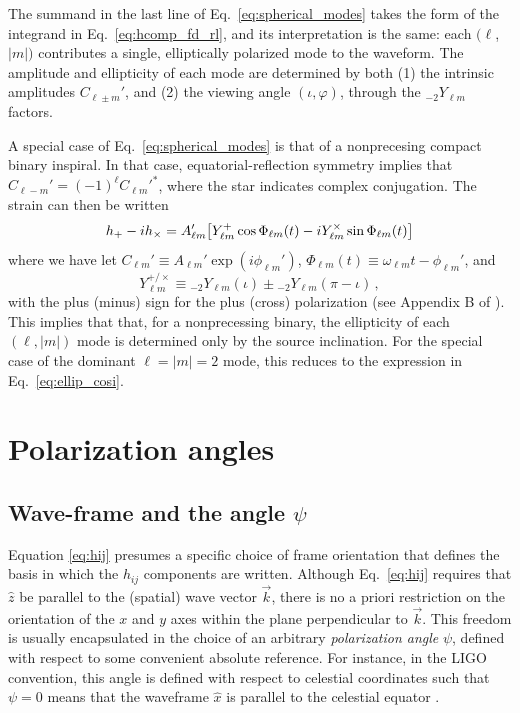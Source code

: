 \documentclass[aps,prd,twocolumn,superscriptaddress,preprintnumbers,floatfix,nofootinbib]{revtex4-2}
\newcommand*{\eq}[1]{Eq.~\eqref{eq:#1}}
\begin{document}
The summand in the last line of \eq{spherical_modes} takes the form of the integrand in \eq{hcomp_fd_rl}, and its interpretation is the same: each $(\ell$, $|m|)$ contributes a single, elliptically polarized mode to the waveform.
The amplitude and ellipticity of each mode are determined by both (1) the intrinsic amplitudes $C_{\ell \pm m}'$, and (2) the viewing angle $(\iota, \varphi)$, through the ${}_{-2} Y_{\ell m}$ factors.

A special case of Eq.~\eqref{eq:spherical_modes} is that of a nonprecesing compact binary inspiral.
In that case, equatorial-reflection symmetry implies that $C_{\ell -m}' = (-1)^\ell C_{\ell m}'^*$, where the star indicates complex conjugation.
The strain can then be written
\begin{equation}
h_+ - i h_\times = A'_{\ell m} \hspace{-2pt} \left[ Y^+_{\ell m} \cos \Phi_{\ell m}(t) - 
i Y^\times_{\ell m} \sin \Phi_{\ell m}(t) \right] 
\end{equation}
where we have let $C_{\ell m}' \equiv A_{\ell m}' \exp(i \phi_{\ell m}')$, $\Phi_{\ell m}(t) \equiv \omega_{\ell m} t - \phi_{\ell m}'$, and
\begin{equation}
Y_{\ell m}^{+/\times} \equiv {}_{-2} Y_{\ell m}(\iota) \pm {}_{-2} Y_{\ell m}(\pi-\iota) \, ,
\end{equation}
with the plus (minus) sign for the plus (cross) polarization (see Appendix B of \cite{Isi:2021iql}).
This implies that that, for a nonprecessing binary, the ellipticity of each $(\ell, |m|)$ mode is determined only by the source inclination.
For the special case of the dominant $\ell=|m|=2$ mode, this reduces to the expression in Eq.~\eqref{eq:ellip_cosi}.


\section{Polarization angles}

\subsection{Wave-frame and the angle $\psi$}
\label{sec:pol}

Equation \eqref{eq:hij} presumes a specific choice of frame orientation that defines the basis in which the $h_{ij}$ components are written.
Although \eq{hij} requires that $\hat{z}$ be parallel to the (spatial) wave vector $\vec{k}$, there is no a priori restriction on the orientation of the $x$ and $y$ axes within the plane perpendicular to $\vec{k}$.
This freedom is usually encapsulated in the choice of an arbitrary \emph{polarization angle} $\psi$, defined with respect to some convenient absolute reference.
For instance, in the LIGO convention, this angle is defined with respect to celestial coordinates such that $\psi=0$ means that the waveframe $\hat{x}$ is parallel to the celestial equator \cite{LALSuite:wave}.
\end{document}
